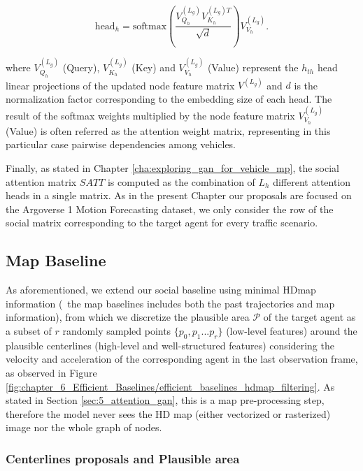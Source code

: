 \begin{equation}
	\mathrm{head}_h = \mathrm{softmax} \left( \frac{V^{(L_g)}_{Q_h} V^{(L_g) T}_{K_h}}{\sqrt{d}}  \right) V^{(L_g)}_{V_h} \text{.}
\end{equation}

where $V^{(L_g)}_{Q_h}$ (Query), $V^{(L_g)}_{K_h}$ (Key) and $V^{(L_g)}_{V_h}$ (Value) represent the \textit{$h_{th}$} head linear projections of the updated node feature matrix $V^{(L_g)}$ and $d$ is the normalization factor corresponding to the embedding size of each head. The result of the softmax weights multiplied by the node feature matrix $V^{(L_g)}_{V_h}$ (Value) is often referred as the attention weight matrix, representing in this particular case pairwise dependencies among vehicles.

Finally, as stated in Chapter \ref{cha:exploring_gan_for_vehicle_mp}, the social attention matrix $SATT$ is computed as the combination of $L_h$ different attention heads in a single matrix. As in the present Chapter our proposals are focused on the Argoverse 1 Motion Forecasting dataset, we only consider the row of the social matrix corresponding to the target agent for every traffic scenario.

\subsection{Map Baseline} 
\label{subsec:6_efficient_baselines_map_baseline}

As aforementioned, we extend our social baseline using minimal \ac{HDmap} information (\ie \ the map baselines includes both the past trajectories and map information), from which we discretize the plausible area $\mathcal{P}$ of the target agent as a subset of $r$ randomly sampled points $\{p_0 , p_1 ... p_r\}$ (low-level features) around the plausible centerlines (high-level and well-structured features) considering the velocity and acceleration of the corresponding agent in the last observation frame, as observed in Figure \ref{fig:chapter_6_Efficient_Baselines/efficient_baselines_hdmap_filtering}. As stated in Section \ref{sec:5_attention_gan}, this is a map pre-processing step, therefore the model never sees the HD map (either vectorized or rasterized) image nor the whole graph of nodes.

\subsubsection{Centerlines proposals and Plausible area} 
\label{subsubsec:6_efficient_baselines_preprocessing_map}

